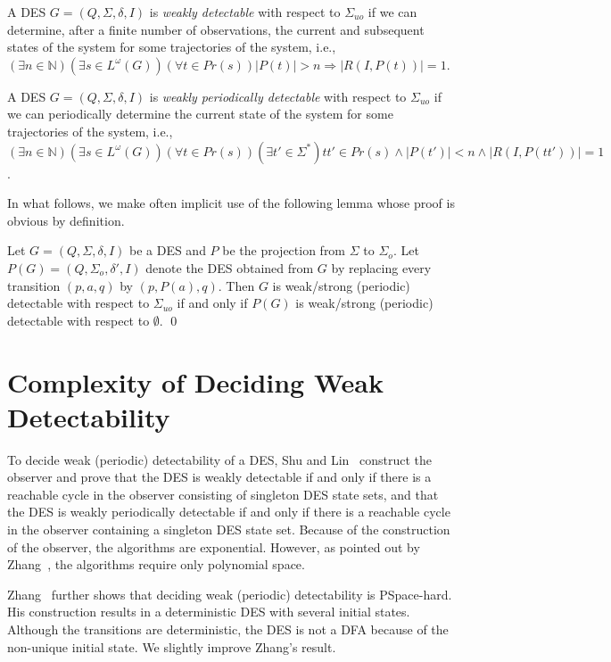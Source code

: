 \documentclass[twocolumn,amsthm]{autartx}
\begin{document}
  \begin{defn}
    A DES $G=(Q,\Sigma,\delta,I)$ is {\em weakly detectable\/} with respect to $\Sigma_{uo}$ if we can determine, after a finite number of observations, the current and subsequent states of the system for some trajectories of the system, i.e., $(\exists n \in \mathbb{N})(\exists s \in L^\omega(G))(\forall t \in Pr(s))|P(t)| > n \Rightarrow |R(I,P(t))| = 1$.
  \end{defn}

  \begin{defn}
    A DES $G=(Q,\Sigma,\delta,I)$ is {\em weakly periodically detectable\/} with respect to $\Sigma_{uo}$ if we can periodically determine the current state of the system for some trajectories of the system, i.e., $(\exists n \in \mathbb{N})(\exists s \in L^\omega(G))(\forall t \in Pr(s))(\exists t' \in \Sigma^*) tt'\in Pr(s) \land |P(t')| < n \land |R(I,P(tt'))| = 1$.
  \end{defn}

  In what follows, we make often implicit use of the following lemma whose proof is obvious by definition.
  \begin{lem}\label{lem5}
    Let $G=(Q,\Sigma,\delta,I)$ be a DES and $P$ be the projection from $\Sigma$ to $\Sigma_o$. Let $P(G)=(Q,\Sigma_o,\delta',I)$ denote the DES obtained from $G$ by replacing every transition $(p,a,q)$ by $(p,P(a),q)$. Then $G$ is weak/strong (periodic) detectable with respect to $\Sigma_{uo}$ if and only if $P(G)$ is weak/strong (periodic) detectable with respect to $\emptyset$. \qed
  \end{lem}

  
\section{Complexity of Deciding Weak Detectability}
  To decide weak (periodic) detectability of a DES, Shu and Lin~\cite{ShuLin2011} construct the observer and prove that the DES is weakly detectable if and only if there is a reachable cycle in the observer consisting of singleton DES state sets, and that the DES is weakly periodically detectable if and only if there is a reachable cycle in the observer containing a singleton DES state set. Because of the construction of the observer, the algorithms are exponential. However, as pointed out by Zhang~\cite{Zhang17}, the algorithms require only polynomial space. 
  
  Zhang~\cite{Zhang17} further shows that deciding weak (periodic) detectability is PSpace-hard. His construction results in a deterministic DES with several initial states. Although the transitions are deterministic, the DES is not a DFA because of the non-unique initial state. We slightly improve Zhang's result.
  
\end{document}
